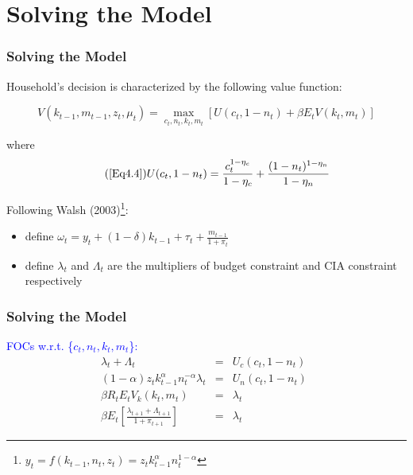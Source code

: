 \documentclass[handout]{beamer}
\begin{document}
\section{Solving the Model}

\begin{frame}
\frametitle{Solving the Model} \vskip 0.1in

Household's decision is characterized by the following value
function:

\begin{equation}\label{Eq4.11}
V(k_{t-1}, m_{t-1}, z_t, \mu_t)= \max_{c_{t},n_{t},k_{t},m_{t}}
[U(c_{t},1-n_{t})+\beta E_{t}V(k_t, m_{t})]
\end{equation}

where
\begin{equation}\tag{\eqref{Eq4.4}}
   U(c_{t},1-n_{t})=\frac{c_{t}^{1-\eta_{c}}}{1-\eta_{c}}+\frac{(1-n_{t})^{1-\eta_{n}}}{1-\eta_{n}}
\end{equation}

\pause

Following Walsh
(2003)\footnote{$y_{t}=f(k_{t-1},n_{t},z_{t})=z_{t}k_{t-1}^{\alpha}n_{t}^{1-\alpha}$}:
\begin{itemize}
\item define $\omega_{t}=y_{t}+(1-\delta)k_{t-1}+\tau_{t}+\frac{m_{t-1}}{1+\pi_{t}}$
\item define $\lambda_{t}$ and $\Lambda_{t}$ are the multipliers of
budget constraint and CIA constraint respectively
\end{itemize}
\end{frame}

\begin{frame}
\frametitle{Solving the Model} \vskip 0.1in

\textcolor{blue}{FOCs w.r.t. \{$c_{t},n_{t},k_{t},m_{t}$\}:}
\begin{eqnarray}
\lambda_{t} + \Lambda_{t} &=& U_{c}(c_{t}, 1-n_t) \label{Eq4.12}\\
(1-\alpha)z_{t}k_{t-1}^{\alpha}n_{t}^{-\alpha}\lambda_{t} &=&
U_{n}(c_{t}, 1-n_t)  ~~\label{Eq4.13}\\
\beta R_{t}E_{t} V_{k}(k_t,m_{t})&=& \lambda_{t} \label{Eq4.14}\\
\beta E_{t} [\frac{\lambda_{t+1}+\Lambda_{t+1}}{1+\pi_{t+1}}] &=&
\lambda_{t}\label{Eq4.15}
\end{eqnarray}
\end{frame}
\end{document}
